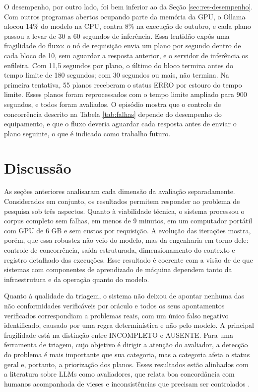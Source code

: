 O desempenho, por outro lado, foi bem inferior ao da Seção \ref{sec:res-desempenho}. Com outros programas abertos ocupando parte da memória da GPU, o Ollama alocou 14\% do modelo na CPU, contra 8\% na execução de outubro, e cada plano passou a levar de 30 a 60 segundos de inferência. Essa lentidão expôs uma fragilidade do fluxo: o nó de requisição envia um plano por segundo dentro de cada bloco de 10, sem aguardar a resposta anterior, e o servidor de inferência os enfileira. Com 11,5 segundos por plano, o último do bloco termina antes do tempo limite de 180 segundos; com 30 segundos ou mais, não termina. Na primeira tentativa, 55 planos receberam o status ERRO por estouro do tempo limite. Esses planos foram reprocessados com o tempo limite ampliado para 900 segundos, e todos foram avaliados. O episódio mostra que o controle de concorrência descrito na Tabela \ref{tab:falhas} depende do desempenho do equipamento, e que o fluxo deveria aguardar cada resposta antes de enviar o plano seguinte, o que é indicado como trabalho futuro.

\section{Discussão}
\label{sec:res-discussao}

As seções anteriores analisaram cada dimensão da avaliação separadamente. Considerados em conjunto, os resultados permitem responder ao problema de pesquisa sob três aspectos. Quanto à viabilidade técnica, o sistema processou o corpus completo sem falhas, em menos de 9 minutos, em um computador portátil com GPU de 6 GB e sem custos por requisição. A evolução das iterações mostra, porém, que essa robustez não veio do modelo, mas da engenharia em torno dele: controle de concorrência, saída estruturada, dimensionamento do contexto e registro detalhado das execuções. Esse resultado é coerente com a visão de  de que sistemas com componentes de aprendizado de máquina dependem tanto da infraestrutura e da operação quanto do modelo.

Quanto à qualidade da triagem, o sistema não deixou de apontar nenhuma das não conformidades verificáveis por oráculo e todos os seus apontamentos verificados correspondiam a problemas reais, com um único falso negativo identificado, causado por uma regra determinística e não pelo modelo. A principal fragilidade está na distinção entre INCOMPLETO e AUSENTE. Para uma ferramenta de triagem, cujo objetivo é dirigir a atenção do avaliador, a detecção do problema é mais importante que sua categoria, mas a categoria afeta o status geral e, portanto, a priorização dos planos. Esses resultados estão alinhados com a literatura sobre LLMs como avaliadores, que relata boa concordância com humanos acompanhada de vieses e inconsistências que precisam ser controlados \cite{Zheng2023, Chang2024}.

